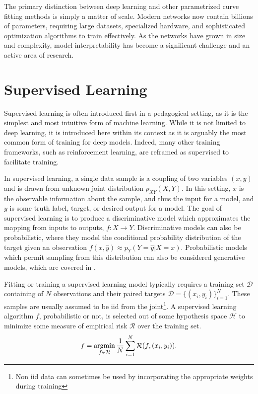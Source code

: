 The primary distinction between deep learning and other parametrized curve fitting methods is simply a matter of scale.
Modern networks now contain billions of parameters, requiring large datasets, specialized hardware, and sophisticated optimization algorithms to train effectively.
As the networks have grown in size and complexity, model interpretability has become a significant challenge and an active area of research.

\section{Supervised Learning}
\label{sec:supervised_learning}

Supervised learning is often introduced first in a pedagogical setting, as it is the simplest and most intuitive form of machine learning. While it is not limited to deep learning, it is introduced here within its context as it is arguably the most common form of training for deep models. Indeed, many other training frameworks, such as reinforcement learning, are reframed as supervised to facilitate training.

In supervised learning, a single data sample is a coupling of two variables $(x, y)$ and is drawn from unknown joint distribution $p_{XY}(X, Y)$.
In this setting, $x$ is the observable information about the sample, and thus the input for a model, and $y$ is some truth label, target, or desired output for a model.
The goal of supervised learning is to produce a discriminative model which approximates the mapping from inputs to outputs, $f: X \rightarrow Y$.
Discriminative models can also be probabilistic, where they model the conditional probability distribution of the target given an observation $f(x, \hat y) \approx p_Y(Y=\hat y|X=x)$.
Probabilistic models which permit sampling from this distribution can also be considered generative models, which are covered in .

Fitting or training a supervised learning model typically requires a training set $\mathcal{D}$ containing of $N$ observations and their paired targets $\mathcal{D} = \{(x_i, y_i)\}_{i=1}^N$.
These samples are usually assumed to be \Gls{iid} from the joint\footnote{Non \Gls{iid} data can sometimes be used by incorporating the appropriate weights during training}.
A supervised learning algorithm $f$, probabilistic or not, is selected out of some hypothesis space $\mathcal{H}$ to minimize some measure of empirical risk $\mathcal{R}$ over the training set.
\begin{equation}
    f = \operatorname*{argmin}_{f \in \mathcal{H}} \frac{1}{N} \sum_{i=1}^N \mathcal{R}(f, (x_i, y_i)).
\end{equation}

